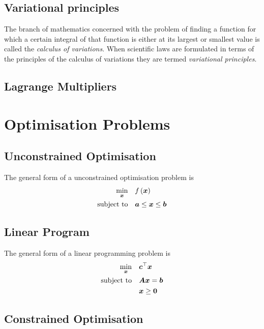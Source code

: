 \subsection{Variational principles}

The branch of mathematics concerned with the problem of finding a function for
which a certain integral of that function is either at its largest or smallest
value is called the \emph{calculus of variations}. When scientific laws are formulated in terms of the principles of the calculus
of variations they are termed \emph{variational principles}. 

\subsection{Lagrange Multipliers}

\section{Optimisation Problems}

\subsection{Unconstrained Optimisation}

The general form of a unconstrained optimisation problem is
\begin{equation}
  \begin{aligned}
    \min_{\vect{x}} & & & \fnof{f}{\vect{x}} \\
    \text{subject to} & & & \vect{a}\le\vect{x}\le\vect{b}
  \end{aligned}
\end{equation}

\subsection{Linear Program}

The general form of a linear programming problem is
\begin{equation}
  \begin{aligned}
    \min_{\vect{x}} & & & \transpose{\vect{c}}{\vect{x}} \\
    \text{subject to} & & & \matr{A}\vect{x}=\vect{b} \\
    & & & \vect{x}\ge\vect{0}
  \end{aligned}
\end{equation}

\subsection{Constrained Optimisation}

